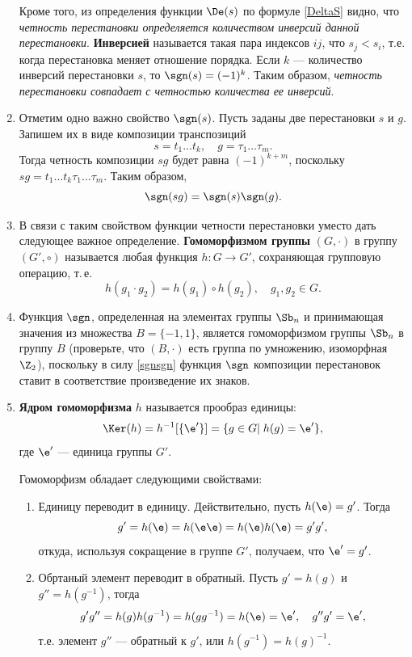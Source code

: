 \begin{enumerate}
Кроме того, из определения функции $\De(s)$ по формуле \eqref{DeltaS} видно, что \textit{четность перестановки  определяется количеством инверсий данной перестановки}. \textbf{Инверсией} называется такая пара индексов $ij$, что $s_j<s_i$, т.е. когда перестановка меняет отношение порядка. Если $k$ --- количество инверсий перестановки $s$, то $\sgn(s)=(-1)^k$. Таким образом, \textit{четность перестановки совпадает с четностью количества ее инверсий}.




\item Отметим одно важно свойство $\sgn(s)$. Пусть заданы две перестановки $s$ и $g$. Запишем их в виде композиции транспозиций
$$
s=t_1\dots t_k,\quad g=\tau_1\dots\tau_m.
$$
Тогда четность композиции $sg$ будет равна $(-1)^{k+m}$, поскольку $sg=t_1\dots t_k\tau_1\dots\tau_m$. Таким образом,
\begin{equation}\label{sgnsgn}
\sgn(sg)=\sgn(s)\sgn(g).
\end{equation}
\item В связи с таким свойством функции четности перестановки уместо дать следующее важное определение.
\textbf{Гомоморфизмом группы} $(G,\cdot)$ в группу $(G',\circ)$ называется любая функция $h:G\to G'$, сохраняющая групповую операцию, т.\,е.
$$
h(g_1\cdot g_2)=h(g_1)\circ h(g_2),\quad g_1,g_2\in G.
$$

\item Функция $\sgn$, определенная на элементах группы $\Sb_n$ и принимающая значения из множества $B=\{-1,1\}$, является гомоморфизмом группы $\Sb_n$ в группу $B$ (проверьте, что $(B,\cdot)$ есть группа по умножению, изоморфная $\Z_2$), поскольку в силу \eqref{sgnsgn} функция $\sgn$ композиции перестановок ставит в соответствие произведение их знаков.

\item \textbf{Ядром гомоморфизма} $h$ называется прообраз единицы:
$$
\Ker(h)= h^{-1}[\{\e'\}]=\{g\in G|\;h(g)=\e'\},
$$
где $\e'$ --- единица группы $G'$.

Гомоморфизм обладает следующими свойствами:
\begin{enumerate}[\bf Hom1]
\item Единицу переводит в единицу. Действительно, пусть $h(\e)=g'$. Тогда
$$
g'=h(\e)=h(\e\e)=h(\e)h(\e)=g'g',
$$
откуда, используя сокращение в группе $G'$, получаем, что $\e'=g'$.

\item Обртаный элемент переводит в обратный. Пусть $g'=h(g)$ и $g''=h(g^{-1})$, тогда
$$
g'g'' = h(g)h(g^{-1})=h(gg^{-1})=h(\e)=\e',\quad g''g'=\e',
$$
т.е. элемент $g''$ --- обратный к $g'$, или $h(g^{-1})=h(g)^{-1}$.


\end{enumerate}
\end{enumerate}
